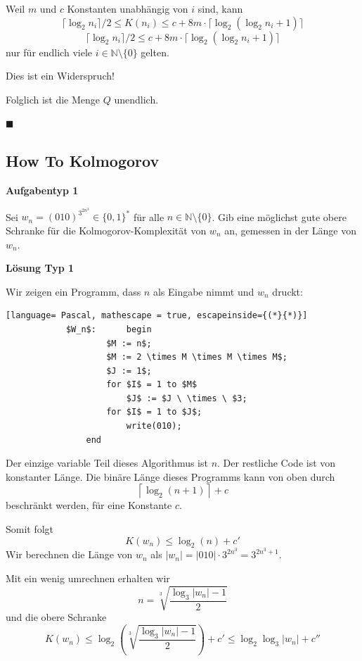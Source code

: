 \documentclass[a4paper, 11pt]{article}
\def\N{\mathbb{N}}
\begin{document}
        Weil $m$ und $c$ Konstanten unabhängig von $i$ sind, kann 
        $$\lceil \log_2 n_i \rceil / 2 \leq K(n_i) \leq c + 8m \cdot \lceil \log_2(\log_2 n_i + 1)\rceil$$
        $$\lceil \log_2 n_i \rceil/2 \leq c + 8m \cdot \lceil \log_2(\log_2 n_i + 1)\rceil$$
        nur für endlich viele $i \in \N \setminus \{0\}$ gelten. 
    
        Dies ist ein Widerspruch! 
    
        Folglich ist die Menge $Q$ unendlich.
    
        \hspace*{0pt}\hfill$\blacksquare$
    
    
    
    \subsection{How To Kolmogorov}
    
    
    
        \textbf{Aufgabentyp 1}

        Sei $w_n = (010)^{3^{2n^3}} \in \{0,1\}^*$ für alle $n \in \N \setminus \{0\}$. Gib eine möglichst gute obere Schranke für die Kolmogorov-Komplexität von $w_n$ an, gemessen in der Länge von $w_n$.
        
        \textbf{Lösung Typ 1}
        
        Wir zeigen ein Programm, dass $n$ als Eingabe nimmt und $w_n$ druckt:
        \begin{lstlisting}[language= Pascal, mathescape = true, escapeinside={(*}{*)}]
            $W_n$:     	begin
                    $M := n$;
                    $M := 2 \times M \times M \times M$;
                    $J := 1$;
                    for $I$ = 1 to $M$                  
                        $J$ := $J \ \times \ $3;
                    for $I$ = 1 to $J$;
                        write(010);
                end
        \end{lstlisting}
    
        Der einzige variable Teil dieses Algorithmus ist $n$. Der restliche Code ist von konstanter Länge. Die binäre Länge dieses Programms kann von oben durch 
        $$\left\lceil\log_2(n+1)\right\rceil + c$$
        beschränkt werden, für eine Konstante $c$.
    
        Somit folgt
        $$K(w_n) \leq \log_2(n) + c'$$
        Wir berechnen die Länge von $w_n$ als $|w_n| = |010| \cdot 3^{2n^3} = 3^{2n^3+1}$. 
        
        Mit ein wenig umrechnen erhalten wir $$n = \sqrt[3]{\frac{\log_3|w_n| - 1}{2}}$$
        und die obere Schranke
        $$K(w_n) \leq \log_2 \left(\sqrt[3]{\frac{\log_3|w_n| - 1}{2}}\right)+ c' \leq \log_2 \log_3 |w_n| + c''$$
    
\end{document}

